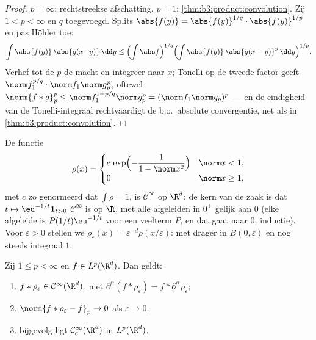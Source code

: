 \begin{proof}
$p = \infty$: rechtstreekse afschatting. $p = 1$:
\cref{thm:b3:product:convolution}. Zij $1 < p < \infty$ en $q$
toegevoegd. Splits $\abs{f(y)} = \abs{f(y)}^{1/q}\cdot
\abs{f(y)}^{1/p}$ en pas Hölder toe:
\[
\int\abs{f(y)}\,\abs{g(x{-}y)}\,\dd y
\leq \Bigl(\int\abs f\Bigr)^{1/q}
\Bigl(\int\abs{f(y)}\,\abs{g(x - y)}^p\,\dd y\Bigr)^{1/p} .
\]
Verhef tot de $p$-de macht en integreer naar $x$; Tonelli op de
tweede factor geeft $\norm f_1^{p/q}\cdot\norm f_1\norm g_p^p$,
oftewel $\norm{f*g}_p^p \leq \norm f_1^{1 + p/q}\norm g_p^p =
(\norm f_1\norm g_p)^p$ --- en de eindigheid van de
Tonelli-integraal rechtvaardigt de b.o.\ absolute convergentie,
net als in \cref{thm:b3:product:convolution}.
\end{proof}

\begin{definition}[Mollifiers]\label{def:b3:lp:mollifier}
De functie
\[
\rho(x) = \begin{cases}
c\,\exp\Bigl(-\dfrac{1}{1 - \norm x^2}\Bigr) & \norm x < 1,\\
0 & \norm x \geq 1,
\end{cases}
\]
met $c$ zo genormeerd dat $\int\rho = 1$, is $\mathcal C^\infty$
op $\R^d$: de kern van de zaak is dat $t \mapsto
\eu^{-1/t}\mathbf 1_{t>0}$ $\mathcal C^\infty$ is op $\R$, met
alle afgeleiden in $0^+$ gelijk aan $0$ (elke afgeleide is
$P(1/t)\eu^{-1/t}$ voor een veelterm $P$, en dat gaat naar $0$;
inductie). Voor $\varepsilon > 0$ stellen we
$\rho_\varepsilon(x) = \varepsilon^{-d}\rho(x/\varepsilon)$: met
drager in $\bar B(0, \varepsilon)$ en nog steeds integraal $1$.
\end{definition}

\begin{theorem}[Regularisatie]\label{thm:b3:lp:regularization}
Zij $1 \leq p < \infty$ en $f \in L^p(\R^d)$. Dan geldt:
\begin{enumerate}
  \item $f * \rho_\varepsilon \in \mathcal C^\infty(\R^d)$, met
        $\partial^\alpha(f * \rho_\varepsilon) = f *
        \partial^\alpha\rho_\varepsilon$;
  \item $\norm{f * \rho_\varepsilon - f}_p \to 0$ als
        $\varepsilon \to 0$;
  \item bijgevolg ligt $\mathcal C^\infty_c(\R^d)$  in
        $L^p(\R^d)$.
\end{enumerate}
\end{theorem}

